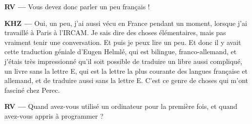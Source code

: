 \documentclass[a4paper,12pt]{article}
\begin{document}
\textbf{RV ---} Vous devez donc parler un peu français !

\textbf{KHZ ---} Oui, un peu, j'ai aussi vécu en France pendant un moment, lorsque j'ai travaillé à Paris à l'IRCAM. Je sais dire des choses élémentaires, mais pas vraiment tenir une conversation. Et puis je peux lire un peu. Et donc il y avait cette traduction géniale d'Eugen Helmlé, qui est bilingue, franco-allemand, et j'étais très impressionné qu'il soit possible de traduire un libre aussi compliqué, un livre sans la lettre E, qui est la lettre la plus courante des langues française et allemand, et de traduire aussi sans la lettre E. C'est ce genre de choses qui m'ont fasciné chez Perec.

\textbf{RV ---} Quand avez-vous utilisé un ordinateur pour la première fois, et quand avez-vous appris à programmer ?
\end{document}
